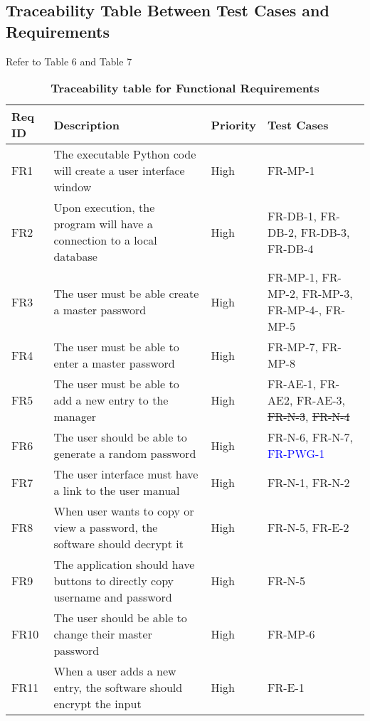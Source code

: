 \documentclass[12pt, titlepage]{article}
\begin{document}
\subsection{Traceability Table Between Test Cases and Requirements}
Refer to Table 6 and Table 7
\begin{table}[!htbp]
    \caption{\textbf{Traceability table for Functional Requirements}} \label{4Table}
    \begin{tabularx}{\textwidth}{p{2cm}Xp{2cm}X}
        \toprule
        \textbf{Req ID} & \textbf{Description} & \textbf{Priority} & \textbf{Test Cases}\\
        \midrule
        FR1  & The executable Python code will create a user interface window & High & FR-MP-1\\\hline
        FR2  & Upon execution, the program will have a connection to a local database & High & FR-DB-1, FR-DB-2, FR-DB-3, FR-DB-4\\\hline
        FR3  & The user must be able create a master password & High & FR-MP-1, FR-MP-2, FR-MP-3, FR-MP-4-, FR-MP-5\\\hline
        FR4  & The user must be able to enter a master password & High & FR-MP-7, FR-MP-8\\\hline
        FR5  & The user must be able to add a new entry to the manager & High & FR-AE-1, FR-AE2, FR-AE-3, \sout{FR-N-3}, \sout{FR-N-4}\\\hline
        FR6  & The user should be able to generate a random password  & High & FR-N-6, FR-N-7, \textcolor{blue}{FR-PWG-1}\\\hline
        FR7  & The user interface must have a link to the user manual & High & FR-N-1, FR-N-2\\\hline
        FR8  & When user wants to copy or view a password, the software should decrypt it & High & FR-N-5, FR-E-2\\\hline
        FR9  & The application should have buttons to directly copy username and password & High & FR-N-5\\\hline
        FR10 & The user should be able to change their master password  & High & FR-MP-6\\\hline
        FR11 & When a user adds a new entry, the software should encrypt the input & High & FR-E-1\\
    
        \bottomrule
    \end{tabularx}
\end{table}
\end{document}
